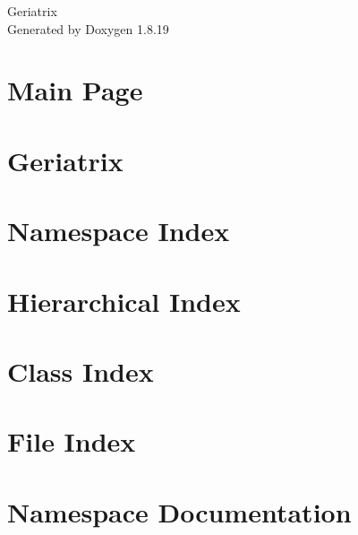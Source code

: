 \let\mypdfximage\pdfximage\def\pdfximage{\immediate\mypdfximage}\documentclass[twoside]{book}
\newcommand{\+}{\discretionary{\mbox{\scriptsize$\hookleftarrow$}}{}{}}
\newcommand{\clearemptydoublepage}{%
  \newpage{\pagestyle{empty}\cleardoublepage}%
}
\begin{document}
\hypersetup{pageanchor=false,
             bookmarksnumbered=true,
             pdfencoding=unicode
            }
\begin{titlepage}
\vspace*{7cm}
\begin{center}%
{\Large Geriatrix }\\
\vspace*{1cm}
{\large Generated by Doxygen 1.8.19}\\
\end{center}
\end{titlepage}
\clearemptydoublepage
{}
\tableofcontents
\clearemptydoublepage
{}
\hypersetup{pageanchor=true}

\chapter{Main Page}
\label{index}\hypertarget{index}{}
\chapter{Geriatrix}
\label{md_README}

\chapter{Namespace Index}

\chapter{Hierarchical Index}

\chapter{Class Index}

\chapter{File Index}

\chapter{Namespace Documentation}








\end{document}
